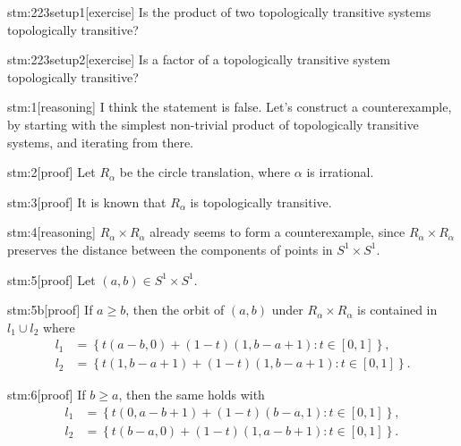 \documentclass{article}
\begin{document}

\begin{stm}{stm:223setup1}[exercise]
Is the product of two topologically transitive systems topologically transitive?
\end{stm}

\begin{stm}{stm:223setup2}[exercise]
Is a factor of a topologically transitive system topologically transitive?
\end{stm}


\begin{stm}{stm:1}[reasoning]
I think the statement is false. Let's construct a counterexample, by starting with the simplest non-trivial product of topologically transitive systems, and iterating from there.
\end{stm}

\begin{stm}{stm:2}[proof]
Let $R_\alpha$ be the circle translation, where $\alpha$ is irrational.
\end{stm}

\begin{stm}{stm:3}[proof]
It is known that $R_\alpha$ is topologically transitive.
\end{stm}

\begin{stm}{stm:4}[reasoning]
$R_\alpha \times R_\alpha$ already seems to form a counterexample, since $R_\alpha \times R_\alpha$ preserves the distance between the components of points in $S^1 \times S^1$.
\end{stm}

\begin{stm}{stm:5}[proof]
Let $(a,b) \in S^1 \times S^1$. 
\end{stm}

\begin{stm}{stm:5b}[proof]
If $a \geq b$, then the orbit of $(a,b)$ under $R_\alpha \times R_\alpha$ is contained in $l_1 \cup l_2$ where
\begin{align*}
l_1 &= \left\{ t(a-b,0) + (1 - t)(1, b-a+1) : t \in [0,1] \right\}, \\
l_2 &= \left\{ t(1, b-a+1) + (1 - t)(1, b-a+1) : t \in [0,1] \right\}.
\end{align*}
\end{stm}

\begin{stm}{stm:6}[proof]
If $b \geq a$, then the same holds with
\begin{align*}
l_1 &= \left\{ t(0, a-b+1) + (1 - t)(b - a, 1) : t \in [0,1] \right\}, \\
l_2 &= \left\{ t(b-a, 0) + (1 - t)(1, a-b+1) : t \in [0,1] \right\}.
\end{align*}
\end{stm}
\end{document}
